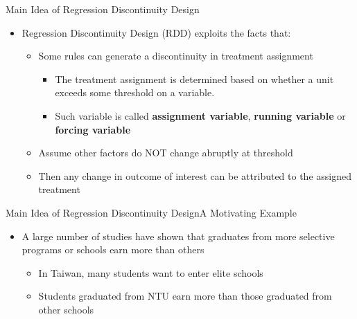 \documentclass[dvipsnames,hyperref={pdfpagelabels=false}]{beamer}
\begin{document}
	\begin{frame}{Main Idea of Regression Discontinuity Design}{}
	\begin{itemize}
		\item Regression Discontinuity Design (RDD) exploits the facts that:
		\vspace{0.2cm}
		\begin{itemize}	
			\item Some rules can generate a discontinuity in treatment assignment
			\vspace{0.2cm}
			\begin{itemize}	
				\item The treatment assignment is determined based on whether a unit exceeds some threshold on a variable. 
				\vspace{0.2cm}
				\item Such variable is called \textbf{assignment variable}, \textbf{running variable} or \textbf{forcing variable}
			\end{itemize}
			\vspace{0.2cm}
			\item Assume other factors do NOT change abruptly at threshold
			\vspace{0.2cm}
			\item Then any change in outcome of interest can be attributed to the assigned treatment
		\end{itemize}
		
	\end{itemize}
\end{frame}

	
	
	
	
	
	
	\begin{frame}{Main Idea of Regression Discontinuity Design}{A Motivating Example}
		\begin{itemize}
			\item A large number of studies have shown that graduates from more
			selective programs or schools earn more than others
			\vspace{0.2cm}
			\begin{itemize}
				\item In Taiwan, many students want to enter elite schools
				\vspace{0.2cm}
				\item Students graduated from NTU earn more than those graduated from other schools
			\end{itemize}
			
		\end{itemize}
	\end{frame}
	
\end{document}
